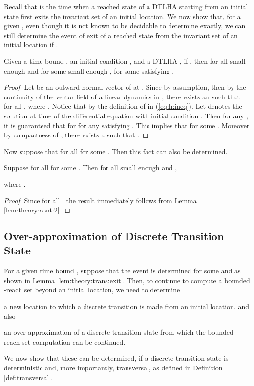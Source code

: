 Recall that  is the time  when a reached state  of a DTLHA starting from an initial state first exits the invariant set of an initial location.
We now show that, for a given , even though it is not known to be decidable to determine  exactly, we can still determine the event of exit of a reached state  from the invariant set of an initial location if .


\begin{lem} \label{lem:theory:trans:exit}
Given a time bound , an initial condition , and a DTLHA , if , then for all small enough  and for some small enough ,  for some  satisfying .
\end{lem}
\begin{proof}
Let  be an outward normal vector of  at .
Since  by assumption, then by the continuity of the vector field of a linear dynamics in , there exists an  such that for all ,  where .
Notice that  by the definition of  in (\ref{eq:h:ineq}).
Let  denotes the solution at time  of the differential equation  with initial condition .
Then for any , it is guaranteed that  for  for any  satisfying .
This implies that  for some .
Moreover by compactness of , there exists a  such that .
\end{proof}


Now suppose that  for all  for some .
Then this fact can also be determined.


\begin{lem} \label{lem:theory:trans:noexit}
Suppose  for all  for some . 
Then for all small enough  and ,

where .
\end{lem}
\begin{proof}
Since  for all , the result immediately follows from Lemma \ref{lem:theory:cont:2}.
\end{proof}



\subsection{Over-approximation of Discrete Transition State}  \label{sec:theory:over}

For a given time bound , suppose that the event  is determined for some  and  as shown in Lemma \ref{lem:theory:trans:exit}.
Then, to continue to compute a bounded -reach set beyond an initial location, we need to determine 
\begin{inparaenum}[(i)]
	\item a new location to which a discrete transition is made from an initial location, and also
	\item an over-approximation of a discrete transition state from which the bounded -reach set computation can be continued.
\end{inparaenum}
We now show that  these can be determined, if a discrete transition state  is deterministic and, more importantly, transversal, as defined in Definition \ref{def:transversal}.


